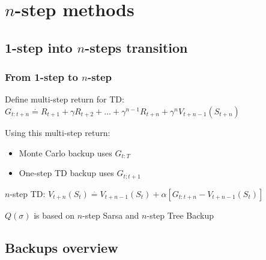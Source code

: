 \documentclass{beamer}
\begin{document}
\section{$n$-step methods}

\subsection{1-step into $n$-steps transition}

\begin{frame}
  \frametitle{From 1-step to $n$-step}
  Define multi-step return for TD: $G_{t : t + n} \overset{\cdot}{=} R_{t + 1} +
    \gamma R_{t + 2} + \ldots + \gamma^{n - 1} R_{t + n} +
    \gamma^n V_{t + n - 1}(S_{t + n})$

  Using this multi-step return:
  \begin{itemize}
    \item Monte Carlo backup uses $G_{t : T}$
    \item One-step TD backup uses $G_{t : t + 1}$
  \end{itemize}

  $n$-step TD: $V_{t + n}(S_t) \overset{\cdot}{=} V_{t + n - 1}(S_t) +
    \alpha [G_{t : t + n} - V_{t + n - 1}(S_t)]$

  $Q(\sigma)$ is based on $n$-step Sarsa and $n$-step Tree Backup
\end{frame}

\subsection{Backups overview}
\end{document}
